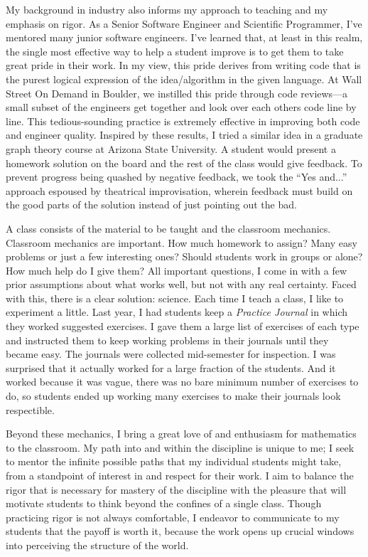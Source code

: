 \documentclass[12pt]{article}
\begin{document}
My background in industry also informs my approach to teaching and my emphasis on rigor. As a Senior Software Engineer and Scientific Programmer, 
I've mentored many junior software engineers. I've learned that, at least in this realm, the single most effective way to help a student improve is to 
get them to take great pride in their work. In my view, this pride derives from writing code that is the purest logical expression of the idea/algorithm in the
 given language. At Wall Street On Demand in Boulder, we instilled this pride through code reviews---a small subset of the engineers get together and look over
 each others code line by line.  This tedious-sounding practice is extremely effective in improving both code and engineer quality. Inspired by these results, 
 I tried a similar idea in a graduate graph theory course at Arizona State University. A student would present a homework solution on the board and the rest of the class 
 would give feedback.  To prevent progress being quashed by negative feedback, we took the ``Yes and...'' approach espoused by theatrical improvisation, wherein feedback 
 must build on the good parts of the solution instead of just pointing out the bad.
 
A class consists of the material to be taught and the classroom mechanics. Classroom mechanics are important.  
How much homework to assign? Many easy problems or just a few interesting ones? Should students work in groups or alone? How much help do I give them?
All important questions, I come in with a few prior assumptions about what works well, but not with any real certainty.  Faced with this, there is a clear solution: science.
Each time I teach a class, I like to experiment a little.  Last year, I had students keep a \emph{Practice Journal} in which they worked suggested exercises.  
I gave them a large list of exercises of each type and instructed them to keep working problems in their journals until they became easy.   The journals
were collected mid-semester for inspection.  I was surprised that it actually worked for a large fraction of the students.  And it worked because it was vague, there
was no bare minimum number of exercises to do, so students ended up working many exercises to make their journals look respectible.
 
Beyond these mechanics, I bring a great love of and enthusiasm for mathematics to the classroom. 
My path into and within the discipline is unique to me; I seek to mentor the infinite possible paths that my individual students might take, 
from a standpoint of interest in and respect for their work. I aim to balance the rigor that is necessary for mastery of the discipline with the pleasure 
that will motivate students to think beyond the confines of a single class. Though practicing rigor is not always comfortable, I endeavor to communicate to
my students that the payoff is worth it, because the work opens up crucial windows into perceiving the structure of the world. 
\end{document}
